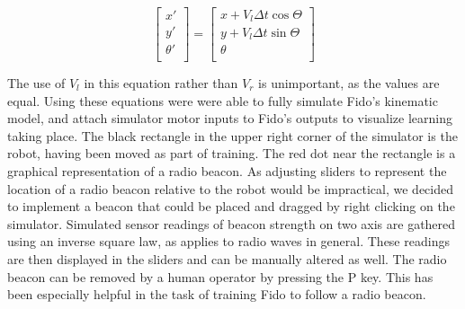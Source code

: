 \begin{equation}
	\begin{bmatrix}
	    x'      \\
	    y'      \\
	    \theta' \\
	\end{bmatrix} =
	\begin{bmatrix}
	    x + V_l\Delta t \cos\Theta \\
	    y + V_l\Delta t \sin\Theta \\
	    \theta \\
	\end{bmatrix}
\end{equation}

The use of $V_l$ in this equation rather than $V_r$ is unimportant, as the values are equal.  Using these equations were were able to fully simulate Fido's kinematic model, and attach simulator motor inputs to Fido's outputs to visualize learning taking place.   The black rectangle in the upper right corner of the simulator is the robot, having been moved as part of training.  The red dot near the rectangle is a graphical representation of a radio beacon.  As adjusting sliders to represent the location of a radio beacon relative to the robot would be impractical, we decided to implement a beacon that could be placed and dragged by right clicking on the simulator.  Simulated sensor readings of beacon strength on two axis are gathered using an inverse square law, as applies to radio waves in general.  These readings are then displayed in the sliders and can be manually altered as well.  The radio beacon can be removed by a human operator by pressing the P key.  This has been especially helpful in the task of training Fido to follow a radio beacon.
